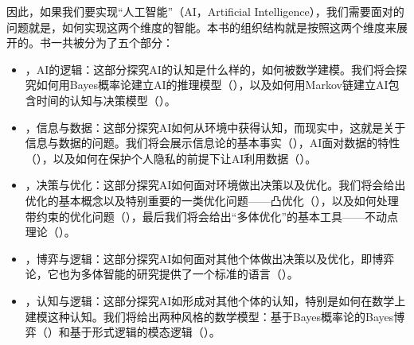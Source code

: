 因此，如果我们要实现“人工智能”（AI，Artificial Intelligence），我们需要面对的问题就是，如何实现这两个维度的智能。本书的组织结构就是按照这两个维度来展开的。书一共被分为了五个部分：
\begin{itemize}
    \item {}，AI的逻辑：这部分探究AI的认知是什么样的，如何被数学建模。我们将会探究如何用Bayes概率论建立AI的推理模型（），以及如何用Markov链建立AI包含时间的认知与决策模型（）。
    \item  {}，信息与数据：这部分探究AI如何从环境中获得认知，而现实中，这就是关于信息与数据的问题。我们将会展示信息论的基本事实（），AI面对数据的特性（），以及如何在保护个人隐私的前提下让AI利用数据（）。
    \item  {}，决策与优化：这部分探究AI如何面对环境做出决策以及优化。我们将会给出优化的基本概念以及特别重要的一类优化问题——凸优化（），以及如何处理带约束的优化问题（），最后我们将会给出“多体优化”的基本工具——不动点理论（）。
    \item  {}，博弈与逻辑：这部分探究AI如何面对其他个体做出决策以及优化，即博弈论，它也为多体智能的研究提供了一个标准的语言（）。
    \item  {}，认知与逻辑：这部分探究AI如形成对其他个体的认知，特别是如何在数学上建模这种认知。我们将给出两种风格的数学模型：基于Bayes概率论的Bayes博弈（）和基于形式逻辑的模态逻辑（）。
\end{itemize}

